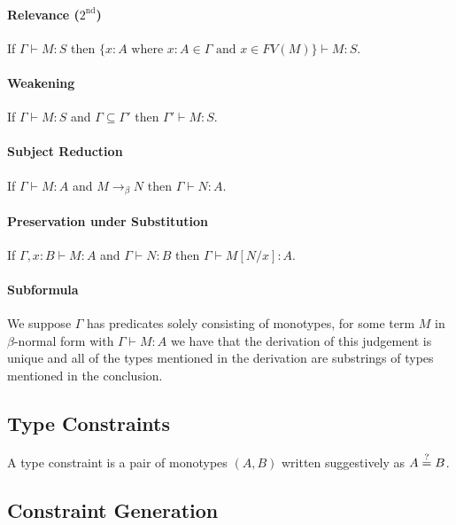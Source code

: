 \paragraph{Relevance ($2^{\text{nd}}$)}
\leavevmode\newline
If $\Gamma \vdash M : S$ then $\{x : A \text{ where }
x : A \in \Gamma \text{ and } x \in FV(M) \} \vdash M : S$.

\paragraph{Weakening}
\leavevmode\newline
If $\Gamma \vdash M : S$ and $\Gamma \subseteq \Gamma'$ then
$\Gamma' \vdash M : S$.

\paragraph{Subject Reduction}
\leavevmode\newline
If $\Gamma \vdash M : A$ and 
$M \to_\beta N$ then $\Gamma \vdash N : A$.

\paragraph{Preservation under Substitution}
\leavevmode\newline
If $\Gamma, x : B \vdash M : A$ and $\Gamma \vdash N : B$
then $\Gamma \vdash M[N / x] : A$.

\paragraph{Subformula}
\leavevmode\newline
We suppose $\Gamma$ has predicates solely consisting of monotypes,
for some term $M$ in $\beta$-normal form with $\Gamma \vdash M : A$
we have that the derivation of this judgement is unique and all
of the types mentioned in the derivation are substrings of types 
mentioned in the conclusion.

\subsection{Type Constraints}

A type constraint is a pair of monotypes $(A, B)$ written
suggestively as $A \teq B$.

\subsection{Constraint Generation}

